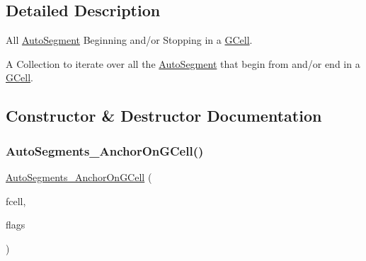 \subsection{Detailed Description}
All \hyperlink{classKatabatic_1_1AutoSegment}{Auto\+Segment} Beginning and/or Stopping in a \hyperlink{classKatabatic_1_1GCell}{G\+Cell}. 

A Collection to iterate over all the \hyperlink{classKatabatic_1_1AutoSegment}{Auto\+Segment} that begin from and/or end in a \hyperlink{classKatabatic_1_1GCell}{G\+Cell}. 

\subsection{Constructor \& Destructor Documentation}
\mbox{\label{classKatabatic_1_1AutoSegments__AnchorOnGCell_a41a8dace22db3bdd8ecbf1850344f885}} 
\subsubsection{\texorpdfstring{Auto\+Segments\+\_\+\+Anchor\+On\+G\+Cell()}{AutoSegments\_AnchorOnGCell()}\hspace{0.1cm}{\footnotesize\ttfamily [1/2]}}
{\footnotesize\ttfamily \hyperlink{classKatabatic_1_1AutoSegments__AnchorOnGCell}{Auto\+Segments\+\_\+\+Anchor\+On\+G\+Cell} (\begin{DoxyParamCaption}\item[{\hyperlink{classKatabatic_1_1GCell}{G\+Cell} $\ast$}]{fcell,  }\item[{unsigned int}]{flags }\end{DoxyParamCaption})\hspace{0.3cm}{\ttfamily [inline]}}

